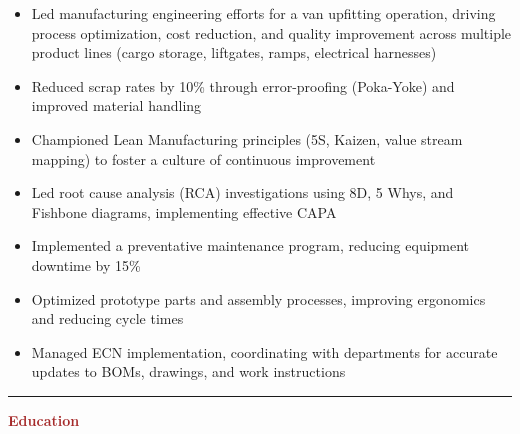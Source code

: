 \documentclass[11pt, letterpaper]{article}
\begin{document}
\begin{itemize}[leftmargin=*, label=\textbullet]
\setlength\itemsep{-2pt}
\vspace{-8pt}
\item Led manufacturing engineering efforts for a van upfitting operation, driving process optimization, cost reduction, and quality improvement across multiple product lines (cargo storage, liftgates, ramps, electrical harnesses)
\item Reduced scrap rates by 10\% through error-proofing (Poka-Yoke) and improved material handling
\item Championed Lean Manufacturing principles (5S, Kaizen, value stream mapping) to foster a culture of continuous improvement
\item	Led root cause analysis (RCA) investigations using 8D, 5 Whys, and Fishbone diagrams, implementing effective CAPA
\item Implemented a preventative maintenance program, reducing equipment downtime by 15\%
\item Optimized prototype parts and assembly processes, improving ergonomics and reducing cycle times
\item Managed ECN implementation, coordinating with departments for accurate updates to BOMs, drawings, and work instructions
\end{itemize}
\vspace{-8pt}
\noindent \rule[2pt]{\textwidth}{0.5pt}
\noindent \textbf{\large \textcolor{Brown}{Education}}\vspace{2pt}\\
\end{document}
